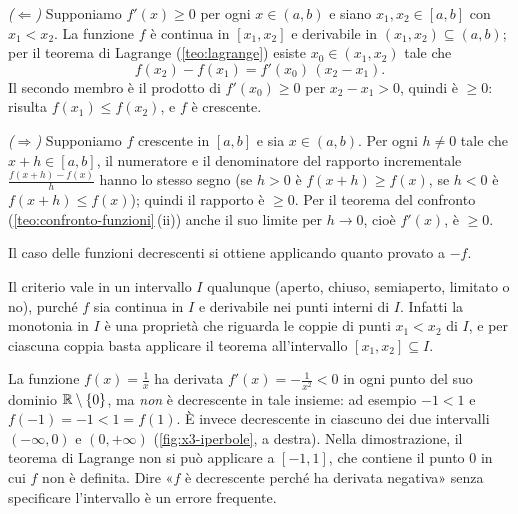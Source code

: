 \begin{dimostrazione}
\emph{($\Leftarrow$)} Supponiamo $f'(x)\ge0$ per ogni $x\in(a,b)$ e siano
$x_{1},x_{2}\in[a,b]$ con $x_{1}<x_{2}$. La funzione $f$ è continua in $[x_{1},x_{2}]$ e
derivabile in $(x_{1},x_{2})\subseteq(a,b)$; per il teorema di Lagrange
(\cref{teo:lagrange}) esiste $x_{0}\in(x_{1},x_{2})$ tale che
\begin{equation}\label{eq:monotonia-lagrange}
  f(x_{2})-f(x_{1})=f'(x_{0})\,(x_{2}-x_{1}) .
\end{equation}
Il secondo membro è il prodotto di $f'(x_{0})\ge0$ per $x_{2}-x_{1}>0$, quindi è $\ge0$:
risulta $f(x_{1})\le f(x_{2})$, e $f$ è crescente.

\emph{($\Rightarrow$)} Supponiamo $f$ crescente in $[a,b]$ e sia $x\in(a,b)$. Per ogni
$h\neq0$ tale che $x+h\in[a,b]$, il numeratore e il denominatore del rapporto
incrementale $\frac{f(x+h)-f(x)}{h}$ hanno lo stesso segno (se $h>0$ è $f(x+h)\ge f(x)$,
se $h<0$ è $f(x+h)\le f(x)$); quindi il rapporto è $\ge0$. Per il teorema del confronto
(\cref{teo:confronto-funzioni}\,(ii)) anche il suo limite per $h\to0$, cioè $f'(x)$, è
$\ge0$.

Il caso delle funzioni decrescenti si ottiene applicando quanto provato a $-f$.
\end{dimostrazione}

\begin{osservazione}\label{oss:monotonia-intervalli}
Il criterio vale in un intervallo $I$ qualunque (aperto, chiuso, semiaperto, limitato o
no), purché $f$ sia continua in $I$ e derivabile nei punti interni di $I$. Infatti la
monotonia in $I$ è una proprietà che riguarda le coppie di punti $x_{1}<x_{2}$ di $I$,
e per ciascuna coppia basta applicare il teorema all'intervallo $[x_{1},x_{2}]\subseteq I$.
\end{osservazione}

\begin{attenzione}
La funzione $f(x)=\frac1x$ ha derivata $f'(x)=-\frac1{x^{2}}<0$ in ogni punto del suo
dominio $\mathbb{R}\setminus\{0\}$, ma \emph{non} è decrescente in tale insieme: ad esempio
$-1<1$ e $f(-1)=-1<1=f(1)$. È invece decrescente in ciascuno dei due intervalli
$(-\infty,0)$ e $(0,+\infty)$ (\cref{fig:x3-iperbole}, a destra). Nella dimostrazione,
il teorema di Lagrange non si può applicare a $[-1,1]$, che contiene il punto $0$ in cui
$f$ non è definita. Dire «$f$ è decrescente perché ha derivata negativa» senza
specificare l'intervallo è un errore frequente.
\end{attenzione}

